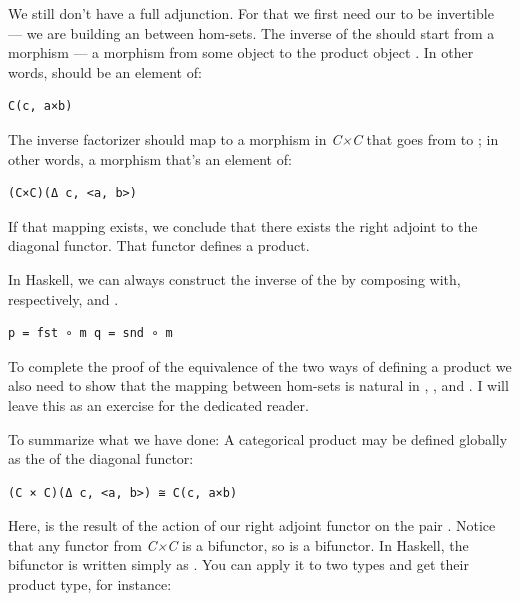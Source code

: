 We still don't have a full adjunction. For that we first need our
 to be invertible --- we are building an
 between hom-sets. The inverse of the
 should start from a morphism  --- a
morphism from some object  to the product object .
In other words,  should be an element of:

\begin{verbatim}
C(c, a×b)
\end{verbatim}

The inverse factorizer should map  to a morphism
 in \emph{C×C} that goes from
 to
; in other words, a morphism
that's an element of:

\begin{verbatim}
(C×C)(Δ c, <a, b>)
\end{verbatim}

If that mapping exists, we conclude that there exists the right adjoint
to the diagonal functor. That functor defines a product.

In Haskell, we can always construct the inverse of the
 by composing  with, respectively,
 and .

\begin{verbatim}
p = fst ∘ m q = snd ∘ m
\end{verbatim}

To complete the proof of the equivalence of the two ways of defining a
product we also need to show that the mapping between hom-sets is
natural in , , and . I will leave this as
an exercise for the dedicated reader.

To summarize what we have done: A categorical product may be defined
globally as the  of the diagonal functor:

\begin{verbatim}
(C × C)(Δ c, <a, b>) ≅ C(c, a×b)
\end{verbatim}

Here,  is the result of the action of our right adjoint
functor  on the pair
. Notice that any functor from
\emph{C×C} is a bifunctor, so  is a bifunctor. In
Haskell, the  bifunctor is written simply as
\code{(,)}. You can apply it to two types and get their product type,
for instance:

